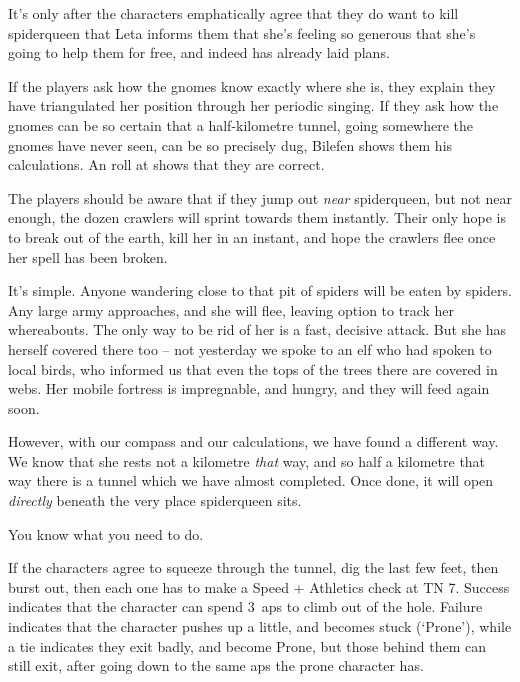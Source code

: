 It's only after the characters emphatically agree that they do want to kill \gls{spiderqueen} that Leta informs them that she's feeling so generous that she's going to help them for free, and indeed has already laid plans.

If the players ask how the gnomes know exactly where she is, they explain they have triangulated her position through her periodic singing.
If they ask how the gnomes can be so certain that a half-kilometre tunnel, going somewhere the gnomes have never seen, can be so precisely dug, Bilefen shows them his calculations.
An  roll at \tn[11] shows that they are correct.

The players should be aware that if they jump out \emph{near} \gls{spiderqueen}, but not near enough, the dozen \glspl{crawler} will sprint towards them instantly.
Their only hope is to break out of the earth, kill her in an instant, and hope the \glspl{crawler} flee once her spell has been broken.

\null
\begin{speechtext}
  It's simple.
  Anyone wandering close to that pit of spiders will be eaten by spiders.
  Any large army approaches, and she will flee, leaving option to track her whereabouts.
  The only way to be rid of her is a fast, decisive attack.
  But she has herself covered there too -- not yesterday we spoke to an elf who had spoken to local birds, who informed us that even the tops of the trees there are covered in webs.
  Her mobile fortress is impregnable, and hungry, and they will feed again soon.

  However, with our compass and our calculations, we have found a different way.
  We know that she rests not a kilometre \emph{that} way, and so half a kilometre that way there is a tunnel which we have almost completed.
  Once done, it will open \emph{directly} beneath the very place \gls{spiderqueen} sits.

  You know what you need to do.
\end{speechtext}

If the characters agree to squeeze through the tunnel, dig the last few feet, then burst out, then each one has to make a Speed + Athletics check at TN 7.
Success indicates that the character can spend 3~\glspl{ap} to climb out of the hole.
Failure indicates that the character pushes up a little, and becomes stuck (`Prone'),%
while a tie indicates they exit badly, and become Prone, but those behind them can still exit, after going down to the same \glspl{ap} the prone character has.

